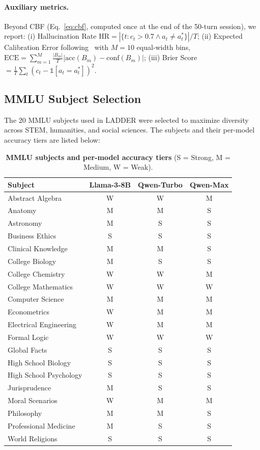 \documentclass[11pt]{article}
\begin{document}
\paragraph{Auxiliary metrics.} Beyond CBF (Eq.~\ref{eq:cbf}, computed once at the end of the 50-turn session), we report: (i) Hallucination Rate $\text{HR} = |\{t : c_t > 0.7 \wedge a_t \neq a_t^*\}| / T$; (ii) Expected Calibration Error following~\citet{guo2017calibration} with $M = 10$ equal-width bins, $\text{ECE} = \sum_{m=1}^M \frac{|B_m|}{T} | \text{acc}(B_m) - \text{conf}(B_m) |$; (iii) Brier Score $= \frac{1}{T} \sum_t (c_t - \mathbb{1}[a_t = a_t^*])^2$.


\subsection{MMLU Subject Selection}
\label{app:subjects}

The 20 MMLU subjects used in LADDER were selected to maximize diversity across STEM, humanities, and social sciences. The subjects and their per-model accuracy tiers are listed below:

\begin{table}[h]
\centering
\caption{\textbf{MMLU subjects and per-model accuracy tiers} (S = Strong, M = Medium, W = Weak).}
\label{tab:subjects}
\vspace{0.5em}
\small
\begin{tabular}{@{}lccc@{}}
\toprule
\textbf{Subject} & \textbf{Llama-3-8B} & \textbf{Qwen-Turbo} & \textbf{Qwen-Max} \\
\midrule
Abstract Algebra       & W & W & M \\
Anatomy                & M & M & S \\
Astronomy              & M & S & S \\
Business Ethics        & S & S & S \\
Clinical Knowledge     & M & M & S \\
College Biology        & M & S & S \\
College Chemistry      & W & W & M \\
College Mathematics    & W & W & W \\
Computer Science       & M & M & M \\
Econometrics           & W & M & M \\
Electrical Engineering & W & M & M \\
Formal Logic           & W & W & W \\
Global Facts           & S & S & S \\
High School Biology    & S & S & S \\
High School Psychology & S & S & S \\
Jurisprudence          & M & S & S \\
Moral Scenarios        & W & M & M \\
Philosophy             & M & M & S \\
Professional Medicine  & M & S & S \\
World Religions        & S & S & S \\
\bottomrule
\end{tabular}
\end{table}
\end{document}
